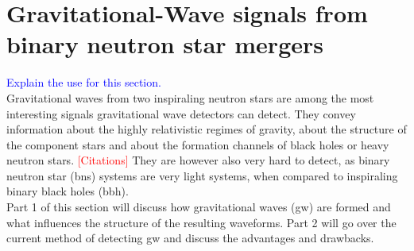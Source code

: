 \section{Gravitational-Wave signals from binary neutron star mergers}
\textcolor{blue}{Explain the use for this section.}\\
Gravitational waves from two inspiraling neutron stars are among the most interesting signals gravitational wave detectors can detect. They convey information about the highly relativistic regimes of gravity, about the structure of the component stars and about the formation channels of black holes or heavy neutron stars. \textcolor{red}{[Citations]} They are however also very hard to detect, as binary neutron star (\gls{bns}) systems are very light systems, when compared to inspiraling binary black holes (\gls{bbh}).\\
Part 1 of this section will discuss how gravitational waves (\gls{gw}) are formed and what influences the structure of the resulting waveforms. Part 2 will go over the current method of detecting \gls{gw} and discuss the advantages and drawbacks.
